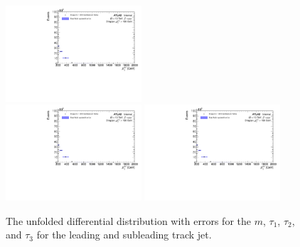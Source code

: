 \begin{figure}[h!]
  \includegraphics[page=688,width=0.45\textwidth]{figures/unfoldErrPlots.pdf} \\
  \includegraphics[page=496,width=0.45\textwidth]{figures/unfoldErrPlots.pdf}
  \includegraphics[page=720,width=0.45\textwidth]{figures/unfoldErrPlots.pdf}
  \caption{The unfolded differential distribution with errors for the $m$, $\tau_1$, $\tau_2$, and $\tau_3$ for the leading and subleading track jet.}
  \label{fig:unfoldErr3}
\end{figure}
